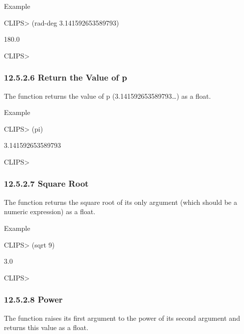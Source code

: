 \documentclass[letterpaper,10pt,english]{sphinxmanual}
\begin{document}
Example

CLIPS\textgreater{} (rad-deg 3.141592653589793)

180.0

CLIPS\textgreater{}


\subsubsection{12.5.2.6 Return the Value of p}
\label{\detokenize{actions:return-the-value-of-p}}
The  function returns the value of p (3.141592653589793…) as a
float.


\begin{sphinxVerbatim}[commandchars=\\\{\}]
\end{sphinxVerbatim}

Example

CLIPS\textgreater{} (pi)

3.141592653589793

CLIPS\textgreater{}


\subsubsection{12.5.2.7 Square Root}
\label{\detokenize{actions:square-root}}
The  function returns the square root of its only argument
(which should be a numeric expression) as a float.


\begin{sphinxVerbatim}[commandchars=\\\{\}]
 
\end{sphinxVerbatim}

Example

CLIPS\textgreater{} (sqrt 9)

3.0

CLIPS\textgreater{}


\subsubsection{12.5.2.8 Power}
\label{\detokenize{actions:power}}
The \sphinxstylestrong{**} function raises its first argument to the power of its
second argument and returns this value as a float.
\end{document}
